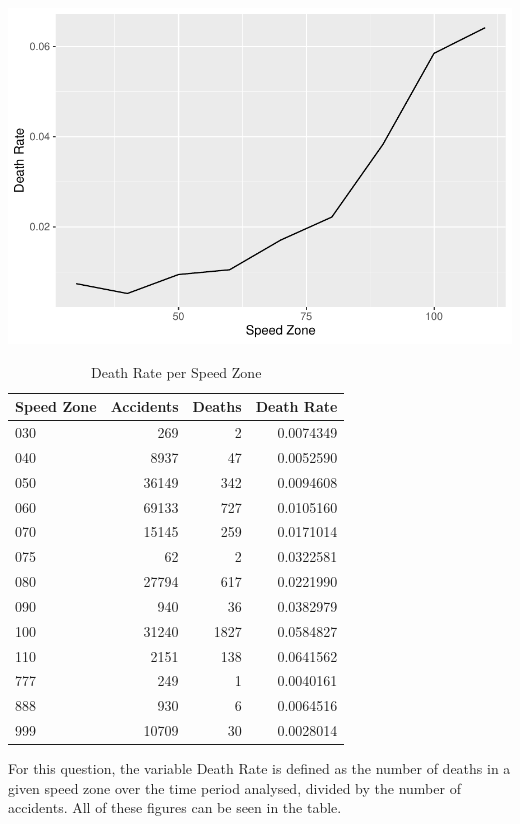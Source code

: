 \documentclass[11pt,a4paper,]{article}
\begin{document}
\includegraphics{Report_files/figure-latex/deaths-per-accident-plot-1.pdf}

\begin{table}

\caption{\label{tab:deaths-per-accident-table}Death Rate per Speed Zone}
\centering
\begin{tabular}[t]{l|r|r|r}
\hline
Speed Zone & Accidents & Deaths & Death Rate\\
\hline
030 & 269 & 2 & 0.0074349\\
\hline
040 & 8937 & 47 & 0.0052590\\
\hline
050 & 36149 & 342 & 0.0094608\\
\hline
060 & 69133 & 727 & 0.0105160\\
\hline
070 & 15145 & 259 & 0.0171014\\
\hline
075 & 62 & 2 & 0.0322581\\
\hline
080 & 27794 & 617 & 0.0221990\\
\hline
090 & 940 & 36 & 0.0382979\\
\hline
100 & 31240 & 1827 & 0.0584827\\
\hline
110 & 2151 & 138 & 0.0641562\\
\hline
777 & 249 & 1 & 0.0040161\\
\hline
888 & 930 & 6 & 0.0064516\\
\hline
999 & 10709 & 30 & 0.0028014\\
\hline
\end{tabular}
\end{table}

For this question, the variable Death Rate is defined as the number of deaths in a given speed zone over the time period analysed, divided by the number of accidents. All of these figures can be seen in the table.
\end{document}
